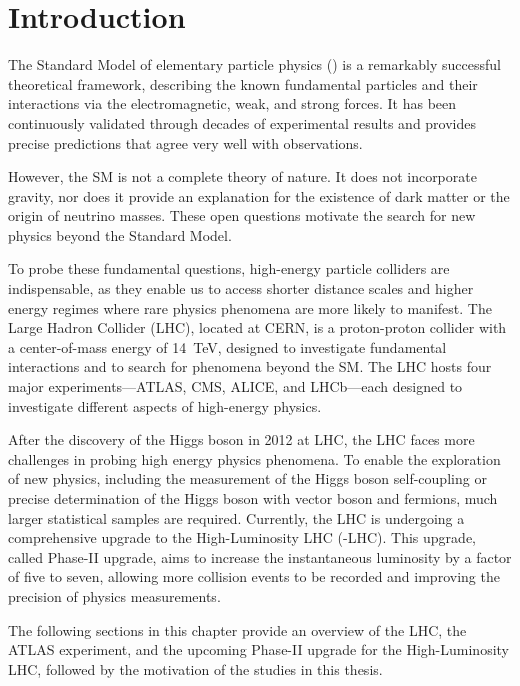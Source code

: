 \chapter{Introduction} \label{ch:introduction}
The Standard Model of elementary particle physics (\SM) is a remarkably successful theoretical framework, describing the known fundamental particles and their interactions via the electromagnetic, weak, and strong forces. It has been continuously validated through decades of experimental results and provides precise predictions that agree very well with observations.

However, the SM is not a complete theory of nature. It does not incorporate gravity, nor does it provide an explanation for the existence of dark matter or the origin of neutrino masses. These open questions motivate the search for new physics beyond the Standard Model.

To probe these fundamental questions, high-energy particle colliders are indispensable, as they enable us to access shorter distance scales and higher energy regimes where rare physics phenomena are more likely to manifest. The Large Hadron Collider (LHC), located at CERN, is a proton-proton collider with a center-of-mass energy of 14~TeV, designed to investigate fundamental interactions and to search for phenomena beyond the SM. The LHC hosts four major experiments—ATLAS, CMS, ALICE, and LHCb—each designed to investigate different aspects of high-energy physics.

After the discovery of the Higgs boson in 2012 at LHC, the LHC faces more challenges in probing high energy physics phenomena. To enable the exploration of new physics, including the measurement of the Higgs boson self-coupling or precise determination of the Higgs boson with vector boson and fermions, much larger statistical samples are required. Currently, the LHC is undergoing a comprehensive upgrade to the High-Luminosity LHC (\HL-LHC). This upgrade, called Phase-II upgrade, aims to increase the instantaneous luminosity by a factor of five to seven, allowing more collision events to be recorded and improving the precision of physics measurements.

The following sections in this chapter provide an overview of the LHC, the ATLAS experiment, and the upcoming Phase-II upgrade for the High-Luminosity LHC, followed by the motivation of the studies in this thesis.
